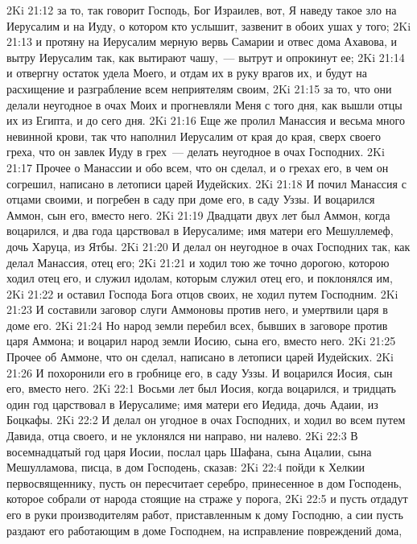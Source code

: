 \vs 2Ki 21:12 за то, так говорит Господь, Бог Израилев, вот, Я наведу такое зло на Иерусалим и на Иуду, о котором кто услышит, зазвенит в обоих ушах у того;
\vs 2Ki 21:13 и протяну на Иерусалим мерную вервь Самарии и отвес дома Ахавова, и вытру Иерусалим так, как вытирают чашу,~--- вытрут и опрокинут ее;
\vs 2Ki 21:14 и отвергну остаток удела Моего, и отдам их в руку врагов их, и будут на расхищение и разграбление всем неприятелям своим,
\vs 2Ki 21:15 за то, что они делали неугодное в очах Моих и прогневляли Меня с того дня, как вышли отцы их из Египта, и до сего дня.
\vs 2Ki 21:16 Еще же пролил Манассия и весьма много невинной крови, так что наполнил  Иерусалим от края до края, сверх своего греха, что он завлек Иуду в грех~--- делать неугодное в очах Господних.
\rsbpar\vs 2Ki 21:17 Прочее о Манассии и обо всем, что он сделал, и о грехах его, в чем он согрешил, написано в летописи царей Иудейских.
\vs 2Ki 21:18 И почил Манассия с отцами своими, и погребен в саду при доме его, в саду Уззы. И воцарился Аммон, сын его, вместо него.
\rsbpar\vs 2Ki 21:19 Двадцати двух лет был Аммон, когда воцарился, и два года царствовал в Иерусалиме; имя матери его Мешуллемеф, дочь Харуца, из Ятбы.
\vs 2Ki 21:20 И делал он неугодное в очах Господних так, как делал Манассия, отец его;
\vs 2Ki 21:21 и ходил тою же точно дорогою, которою ходил отец его, и служил идолам, которым служил отец его, и поклонялся им,
\vs 2Ki 21:22 и оставил Господа Бога отцов своих, не ходил путем Господним.
\vs 2Ki 21:23 И составили заговор слуги Аммоновы против него, и умертвили царя в доме его.
\vs 2Ki 21:24 Но народ земли перебил всех, бывших в заговоре против царя Аммона; и воцарил народ земли Иосию, сына его, вместо него.
\rsbpar\vs 2Ki 21:25 Прочее об Аммоне, что он сделал, написано в летописи царей Иудейских.
\vs 2Ki 21:26 И похоронили его в гробнице его, в саду Уззы. И воцарился Иосия, сын его, вместо него.
\vs 2Ki 22:1 Восьми лет был Иосия, когда воцарился, и тридцать один год царствовал в Иерусалиме; имя матери его Иедида, дочь Адаии, из Боцкафы.
\vs 2Ki 22:2 И делал он угодное в очах Господних, и ходил во всем путем Давида, отца своего, и не уклонялся ни направо, ни налево.
\rsbpar\vs 2Ki 22:3 В восемнадцатый год царя Иосии, послал царь Шафана, сына Ацалии, сына Мешулламова, писца, в дом Господень, сказав:
\vs 2Ki 22:4 пойди к Хелкии первосвященнику, пусть он пересчитает серебро, принесенное в дом Господень, которое собрали от народа стоящие на страже у порога,
\vs 2Ki 22:5 и пусть отдадут его в руки производителям работ, приставленным к дому Господню, а сии пусть раздают его работающим в доме Господнем, на исправление повреждений дома,
